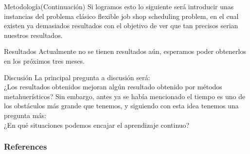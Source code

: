 \documentclass{beamer}
\begin{document}
\begin{frame}{Metodología}{(Continuación)}
    Si logramos esto lo siguiente será introducir unas instancias del problema clásico flexible job shop scheduling problem, en el cual existen ya demasiados resultados con el objetivo  de ver que tan precisos serian nuestros resultados.
\end{frame}

\begin{frame}{Resultados}
Actualmente no se tienen resultados aún, esperamos poder obtenerlos en los próximos tres meses.
\end{frame}

\begin{frame}{Discusión}
La principal pregunta a discusión será: \\ ¿Los resultados obtenidos mejoran algún resultado obtenido por métodos metahuerísticos?
\newline
Sin embargo, antes ya se había mencionado el tiempo es uno de los obstáculos más grande que tenemos, y siguiendo con esta idea tenemos una pregunta más: \\ ¿En qué situaciones podemos encajar el aprendizaje continuo?
\end{frame}

\begin{frame}[allowframebreaks] %
	\frametitle{References}
	
	\scriptsize{}
	
\end{frame}
\end{document}
